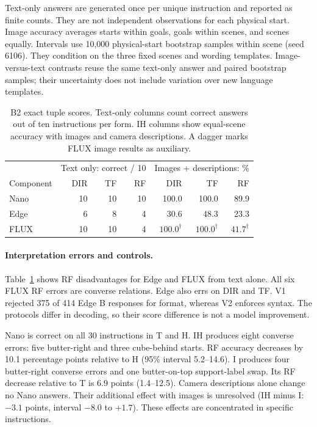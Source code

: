 \documentclass{article}
\begin{document}
Text-only answers are generated once per unique instruction and reported as finite counts. They are not independent observations for each physical start. Image accuracy averages starts within goals, goals within scenes, and scenes equally. Intervals use 10,000 physical-start bootstrap samples within scene (seed 6106). They condition on the three fixed scenes and wording templates. Image-versus-text contrasts reuse the same text-only answer and paired bootstrap samples; their uncertainty does not include variation over new language templates.

\begin{table}[htbp]
\centering\small
\caption{B2 exact tuple scores. Text-only columns count correct answers out of ten instructions per form. IH columns show equal-scene accuracy with images and camera descriptions. A dagger marks FLUX image results as auxiliary.}
\label{tab:vqa-full}
\begin{tabular}{@{}lrrr@{\qquad}rrr@{}}
\toprule
& \multicolumn{3}{c}{Text only: correct / 10}
& \multicolumn{3}{c}{Images + descriptions: \%}\\
Component & DIR & TF & RF & DIR & TF & RF\\
\midrule
Nano & 10 & 10 & 10 & 100.0 & 100.0 & 89.9\\
Edge & 6 & 8 & 4 & 30.6 & 48.3 & 23.3\\
FLUX & 10 & 10 & 4 & $100.0^\dagger$ & $100.0^\dagger$ & $41.7^\dagger$\\
\bottomrule
\end{tabular}
\end{table}

\paragraph{Interpretation errors and controls.}
Table~\ref{tab:vqa-full} shows RF disadvantages for Edge and FLUX from text alone. All six FLUX RF errors are converse relations. Edge also errs on DIR and TF. V1 rejected 375 of 414 Edge B responses for format, whereas V2 enforces syntax. The protocols differ in decoding, so their score difference is not a model improvement.

Nano is correct on all 30 instructions in T and H. IH produces eight converse errors: five butter-right and three cube-behind starts. RF accuracy decreases by 10.1 percentage points relative to H (95\% interval 5.2--14.6). I produces four butter-right converse errors and one butter-on-top support-label swap. Its RF decrease relative to T is 6.9 points (1.4--12.5). Camera descriptions alone change no Nano answers. Their additional effect with images is unresolved (IH minus I: $-3.1$ points, interval $-8.0$ to $+1.7$). These effects are concentrated in specific instructions.
\end{document}
